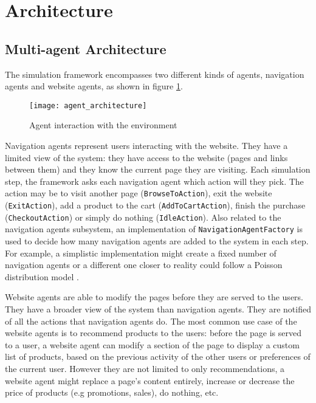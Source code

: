 \section{Architecture}

\subsection{Multi-agent Architecture}\label{ssec:multiagents}

The simulation framework encompasses two different kinds of agents, navigation 
agents and website agents, as shown in figure \ref{fig:agent_arch}.

\begin{figure}[!h]
    \begin{center}
        \leavevmode
        \texttt{[image: agent\_architecture]}
        \caption{Agent interaction with the environment}
        \label{fig:agent_arch}
    \end{center}
\end{figure}

Navigation agents represent users interacting with the website. They have a 
limited view of the system: they have access to the website (pages and links 
between them) and they know the current page they are visiting. Each simulation 
step, the framework asks each navigation agent which action will they pick. The 
action may be to visit another page (\texttt{BrowseToAction}), exit the 
website (\texttt{ExitAction}), add a product to the cart 
(\texttt{AddToCartAction}), finish the purchase (\texttt{CheckoutAction}) 
or simply do nothing (\texttt{IdleAction}). Also related to the navigation 
agents subsystem, an implementation of \texttt{NavigationAgentFactory} is 
used to decide how many navigation agents are added to the system in each step. 
For example, a simplistic implementation might create a fixed number of 
navigation agents or a different one closer to reality could follow a Poisson 
distribution model \cite{gunduz2003poisson}.

Website agents are able to modify the pages before they are served to the 
users. They have a broader view of the system than navigation agents. They are 
notified of all the actions that navigation agents do. The most common use 
case of the website agents is to recommend products to the users: before the 
page is served to a user, a website agent can modify a section of the page to 
display a custom list of products, based on the previous activity of the other 
users or preferences of the current user. However they are not limited to only 
recommendations, a website agent might replace a page's content entirely, 
increase or decrease the price of products (e.g promotions, sales), do nothing, 
etc.

